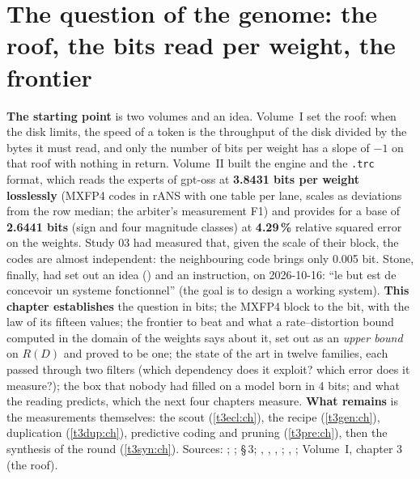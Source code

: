 \chapter{The question of the genome: the roof, the bits read per weight, the frontier}\label{t3que:ch}

\begin{origine}
\textbf{The starting point} is two volumes and an idea. Volume~I set the roof: when the disk limits, the speed of a token is the throughput of the disk divided by the bytes it must read, and only the number of bits per weight has a slope of $-1$ on that roof with nothing in return. Volume~II built the engine and the \texttt{.trc} format, which reads the experts of gpt-oss at \textbf{3.8431 bits per weight losslessly} (MXFP4 codes in rANS with one table per lane, scales as deviations from the row median; the arbiter's measurement F1) and provides for a base of \textbf{2.6441 bits} (sign and four magnitude classes) at \textbf{4.29\,\%} relative squared error on the weights. Study 03 had measured that, given the scale of their block, the codes are almost independent: the neighbouring code brings only 0.005 bit. Stone, finally, had set out an idea () and an instruction, on 2026-10-16: ``le but est de concevoir un systeme fonctionnel'' (the goal is to design a working system).
\textbf{This chapter establishes} the question in bits; the MXFP4 block to the bit, with the law of its fifteen values; the frontier to beat and what a rate--distortion bound computed in the domain of the weights says about it, set out as an \emph{upper bound} on $R(D)$ and proved to be one; the state of the art in twelve families, each passed through two filters (which dependency does it exploit? which error does it measure?); the box that nobody had filled on a model born in 4 bits; and what the reading predicts, which the next four chapters measure.
\textbf{What remains} is the measurements themselves: the scout (\cref{t3ecl:ch}), the recipe (\cref{t3gen:ch}), duplication (\cref{t3dup:ch}), predictive coding and pruning (\cref{t3pre:ch}), then the synthesis of the round (\cref{t3syn:ch}).
Sources: ; ;  §\,3; , , , ; , ; Volume~I, chapter 3 (the roof).
\end{origine}

